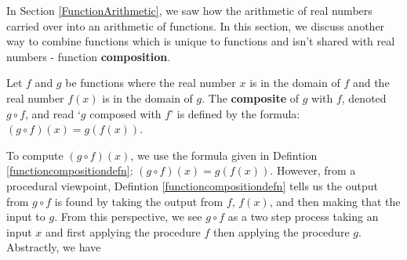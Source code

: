 \documentclass{ximera}
\begin{document}
	\author{Stitz-Zeager}




\setcounter{footnote}{0}

\label{FunctionComposition}

In Section \ref{FunctionArithmetic}, we saw how the arithmetic of real numbers carried over into an arithmetic of functions.  In this section, we discuss another way to combine functions which is unique to functions and isn't shared with real numbers - function \textbf{composition}.

\smallskip


\begin{definition} \label{functioncompositiondefn} Let $f$ and $g$ be functions where the real number $x$ is in the domain of $f$ and the real number $f(x)$ is in the domain of $g$.  The \textbf{composite} of $g$ with $f$, denoted $g \circ f$, and read `$g$ composed with $f$' is defined by the formula: $(g \circ f) (x) = g(f(x))$.

\end{definition}

\smallskip

To compute $(g \circ f)(x) $, we use the formula given in  Defintion \ref{functioncompositiondefn}:   $(g \circ f) (x) = g(f(x))$.  However, from a procedural viewpoint, Defintion \ref{functioncompositiondefn} tells us  the output from $g \circ f$ is found by taking the output from $f$, $f(x)$,  and then making that the input to $g$.   From this perspective, we see $g \circ f$ as a two step process taking an input $x$ and first applying the procedure $f$ then applying the procedure $g$.  Abstractly, we have

\begin{center}

\footnotesize

% 


\end{center}
\end{document}
